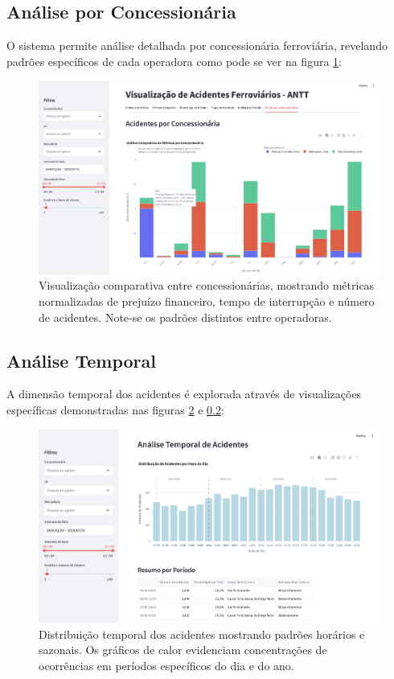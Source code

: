\documentclass[conference]{IEEEtran}
\begin{document}
\subsection{Análise por Concessionária}

O sistema permite análise detalhada por concessionária ferroviária, revelando padrões específicos de cada operadora como pode se ver na figura \ref{fig:analise_concessionaria}:

\begin{figure}[!htb]
    \centering
    \includegraphics[width=0.8\linewidth]{analise_concessionaria.png}
    \caption{Visualização comparativa entre concessionárias, mostrando métricas normalizadas de prejuízo financeiro, tempo de interrupção e número de acidentes. Note-se os padrões distintos entre operadoras.}
    \label{fig:analise_concessionaria}
\end{figure}

\subsection{Análise Temporal}

A dimensão temporal dos acidentes é explorada através de visualizações específicas demonstradas nas figuras \ref{fig:analise_temporal} e \ref{}:

\begin{figure}[!htb]
    \centering
    \includegraphics[width=0.8\linewidth]{analise_temporal.png}
    \caption{Distribuição temporal dos acidentes mostrando padrões horários e sazonais. Os gráficos de calor evidenciam concentrações de ocorrências em períodos específicos do dia e do ano.}
    \label{fig:analise_temporal}
\end{figure}
\end{document}
